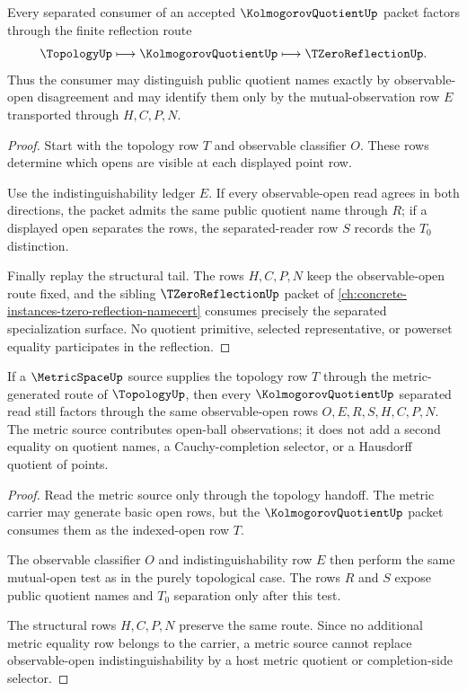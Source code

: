 \begin{theorem}
\label{thm:kolmogorov-quotient-tzero-reflection}
Every separated consumer of an accepted $\KolmogorovQuotientUp$ packet factors through the finite reflection route
$$
\TopologyUp \longmapsto \KolmogorovQuotientUp \longmapsto \TZeroReflectionUp .
$$
Thus the consumer may distinguish public quotient names exactly by observable-open disagreement and may identify them only by the mutual-observation row $E$ transported through $H,C,P,N$.
\end{theorem}
\begin{proof}
Start with the topology row $T$ and observable classifier $O$. These rows determine which opens are visible at each displayed point row.

Use the indistinguishability ledger $E$. If every observable-open read agrees in both directions, the packet admits the same public quotient name through $R$; if a displayed open separates the rows, the separated-reader row $S$ records the $T_0$ distinction.

Finally replay the structural tail. The rows $H,C,P,N$ keep the observable-open route fixed, and the sibling $\TZeroReflectionUp$ packet of \autoref{ch:concrete-instances-tzero-reflection-namecert} consumes precisely the separated specialization surface. No quotient primitive, selected representative, or powerset equality participates in the reflection.
\end{proof}

\begin{theorem}
\label{thm:kolmogorov-quotient-metric-source-compatibility}
If a $\MetricSpaceUp$ source supplies the topology row $T$ through the metric-generated route of $\TopologyUp$, then every $\KolmogorovQuotientUp$ separated read still factors through the same observable-open rows $O,E,R,S,H,C,P,N$. The metric source contributes open-ball observations; it does not add a second equality on quotient names, a Cauchy-completion selector, or a Hausdorff quotient of points.
\end{theorem}
\begin{proof}
Read the metric source only through the topology handoff. The metric carrier may generate basic open rows, but the $\KolmogorovQuotientUp$ packet consumes them as the indexed-open row $T$.

The observable classifier $O$ and indistinguishability row $E$ then perform the same mutual-open test as in the purely topological case. The rows $R$ and $S$ expose public quotient names and $T_0$ separation only after this test.

The structural rows $H,C,P,N$ preserve the same route. Since no additional metric equality row belongs to the carrier, a metric source cannot replace observable-open indistinguishability by a host metric quotient or completion-side selector.
\end{proof}

